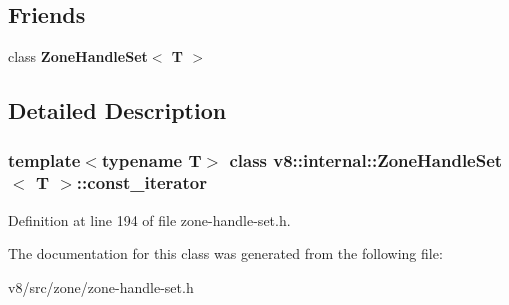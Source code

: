 \subsection*{Friends}
\begin{DoxyCompactItemize}
\item 
\mbox{\label{classv8_1_1internal_1_1ZoneHandleSet_1_1const__iterator_a7d93b54f7559339ab8b572dfe2759889}} 
class {\bfseries Zone\+Handle\+Set$<$ T $>$}
\end{DoxyCompactItemize}


\subsection{Detailed Description}
\subsubsection*{template$<$typename T$>$\newline
class v8\+::internal\+::\+Zone\+Handle\+Set$<$ T $>$\+::const\+\_\+iterator}



Definition at line 194 of file zone-\/handle-\/set.\+h.



The documentation for this class was generated from the following file\+:\begin{DoxyCompactItemize}
\item 
v8/src/zone/zone-\/handle-\/set.\+h\end{DoxyCompactItemize}

